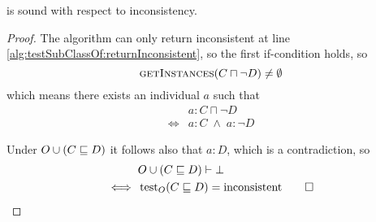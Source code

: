 \documentclass[paper.tex]{subfiles}
\begin{document}
\begin{proposition}
  \label{prop:testSubClassOfInconsistentSound}
   is sound with respect to inconsistency.
\end{proposition}
\begin{proof}
  The algorithm can only return inconsistent at line \ref{alg:testSubClassOf:returnInconsistent}, so the first if-condition holds, so
  \[ \Call{getInstances}{C \sqcap \neg D} \ne \emptyset \]
  which means there exists an individual $a$ such that
  \begin{align*}
    & a : C \sqcap \neg D \\
    \iff{}& a : C \;\land\; a : \neg D
  \end{align*}

  Under $O \cup (C \sqsubseteq D)$ it follows also that $a : D$, which is a contradiction, so
  \begin{align*}
    & O \cup (C \sqsubseteq D) \vdash \bot \\
    \iff{}& \operatorname{test}_O(C \sqsubseteq D) = \mathrm{inconsistent}
    \qed
  \end{align*}
\end{proof}
\end{document}
